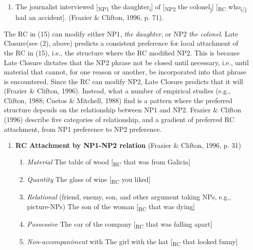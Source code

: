 \documentclass[11pt,oneside]{book}
\providecommand{\tightlist}{%
  \setlength{\itemsep}{0pt}\setlength{\parskip}{0pt}}
\begin{document}
\begin{enumerate}
\def\labelenumi{(\arabic{enumi})}
\setcounter{enumi}{14}
\tightlist
\item
  The journalist interviewed {[}\textsubscript{NP1} the daughter\textsubscript{i}{]} of {[}\textsubscript{NP2} the colonel\textsubscript{j}{]} {[}\textsubscript{RC} who\textsubscript{i/j} had an accident{]}. (Frazier \& Clifton, 1996, p. 71).
\end{enumerate}

The RC in (15) can modify either NP1, \emph{the daughter}, or NP2 \emph{the colonel}. Late Closure(see (2), above) predicts a consistent preference for local attachment of the RC in (15), i.e., the structure where the RC modified NP2. This is because Late Closure dictates that the NP2 phrase not be closed until necessary, i.e., until material that cannot, for one reason or another, be incorporated into that phrase is encountered. Since the RC can modify NP2, Late Closure predicts that it will (Frazier \& Clifton, 1996). Instead, what a number of empirical studies (e.g., Clifton, 1988; Cuetos \& Mitchell, 1988) find is a pattern where the preferred structure depends on the relationship between NP1 and NP2. Frazier \& Clifton (1996) describe five categories of relationship, and a gradient of preferred RC attachment, from NP1 preference to NP2 preference.

\begin{enumerate}
\def\labelenumi{(\arabic{enumi})}
\setcounter{enumi}{15}
\tightlist
\item
  \textbf{RC Attachment by NP1-NP2 relation} (Frazier \& Clifton, 1996, p. 31)

  \begin{enumerate}
  \def\labelenumii{\alph{enumii}.}
  \tightlist
  \item
    \emph{Material} \linebreak\nopagebreak
    The table of wood {[}\textsubscript{RC} that was from Galicia{]}
  \item
    \emph{Quantity} \linebreak\nopagebreak
    The glass of wine {[}\textsubscript{RC} you liked{]}
  \item
    \emph{Relational} (friend, enemy, son, and other argument taking NPs, e.g., picture-NPs) \linebreak\nopagebreak
    The son of the woman {[}\textsubscript{RC} that was dying{]}
  \item
    \emph{Possessive} \linebreak\nopagebreak
    The car of the company {[}\textsubscript{RC} that was falling apart{]}
  \item
    \emph{Non-accompaniment} with \linebreak\nopagebreak
    The girl with the hat {[}\textsubscript{RC} that looked funny{]}
  \end{enumerate}
\end{enumerate}
\end{document}
